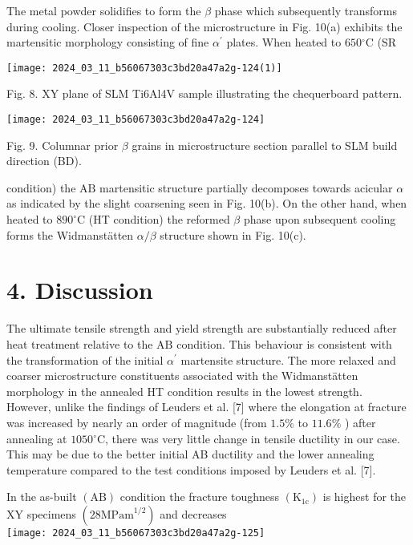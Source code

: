\documentclass[10pt]{article}
\begin{document}
The metal powder solidifies to form the $\beta$ phase which subsequently transforms during cooling. Closer inspection of the microstructure in Fig. 10(a) exhibits the martensitic morphology consisting of fine $\alpha^{\prime}$ plates. When heated to $650{ }^{\circ} \mathrm{C}$ (SR

\begin{center}
\texttt{[image: 2024\_03\_11\_b56067303c3bd20a47a2g-124(1)]}
\end{center}

Fig. 8. XY plane of SLM Ti6Al4V sample illustrating the chequerboard pattern.

\begin{center}
\texttt{[image: 2024\_03\_11\_b56067303c3bd20a47a2g-124]}
\end{center}

Fig. 9. Columnar prior $\beta$ grains in microstructure section parallel to SLM build direction (BD).

condition) the $\mathrm{AB}$ martensitic structure partially decomposes towards acicular $\alpha$ as indicated by the slight coarsening seen in Fig. 10(b). On the other hand, when heated to $890^{\circ} \mathrm{C}$ (HT condition) the reformed $\beta$ phase upon subsequent cooling forms the Widmanstätten $\alpha / \beta$ structure shown in Fig. 10(c).

\section*{4. Discussion}
The ultimate tensile strength and yield strength are substantially reduced after heat treatment relative to the $\mathrm{AB}$ condition. This behaviour is consistent with the transformation of the initial $\alpha^{\prime}$ martensite structure. The more relaxed and coarser microstructure constituents associated with the Widmanstätten morphology in the annealed HT condition results in the lowest strength. However, unlike the findings of Leuders et al. [7] where the elongation at fracture was increased by nearly an order of magnitude (from $1.5 \%$ to $11.6 \%$ ) after annealing at $1050{ }^{\circ} \mathrm{C}$, there was very little change in tensile ductility in our case. This may be due to the better initial AB ductility and the lower annealing temperature compared to the test conditions imposed by Leuders et al. [7].

In the as-built $(\mathrm{AB})$ condition the fracture toughness $\left(\mathrm{K}_{1 \mathrm{c}}\right)$ is highest for the XY specimens $\left(28 \mathrm{MPam}^{1 / 2}\right)$ and decreases\\
\texttt{[image: 2024\_03\_11\_b56067303c3bd20a47a2g-125]}
\end{document}
